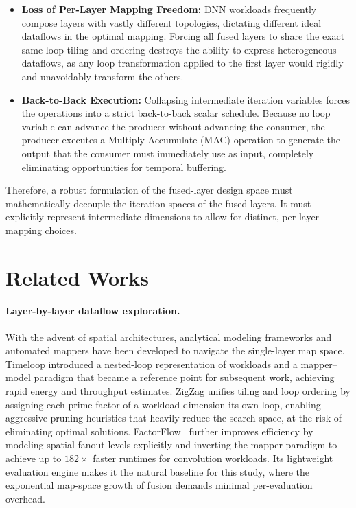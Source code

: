 \documentclass[11pt,a4paper,twocolumn]{article}
\begin{document}
\begin{itemize}
    \item \textbf{Loss of Per-Layer Mapping Freedom:} DNN workloads frequently compose layers with vastly different topologies, dictating different ideal dataflows in the optimal mapping. Forcing all fused layers to share the exact same loop tiling and ordering destroys the ability to express heterogeneous dataflows, as any loop transformation applied to the first layer would rigidly and unavoidably transform the others.
    
    \item \textbf{Back-to-Back Execution:} Collapsing intermediate iteration variables forces the operations into a strict back-to-back scalar schedule. Because no loop variable can advance the producer without advancing the consumer, the producer executes a Multiply-Accumulate (MAC) operation to generate the output that the consumer must immediately use as input, completely eliminating opportunities for temporal buffering.
\end{itemize}

Therefore, a robust formulation of the fused-layer design space must mathematically decouple the iteration spaces of the fused layers. It must explicitly represent intermediate dimensions to allow for distinct, per-layer mapping choices.



\section*{Related Works}

\paragraph{Layer-by-layer dataflow exploration.}
With the advent of spatial architectures, analytical modeling
frameworks and automated mappers have been developed to navigate
the single-layer map space.
Timeloop introduced a nested-loop
representation of workloads and a mapper--model paradigm that
became a reference point for subsequent work, achieving rapid energy and throughput estimates.
ZigZag unifies tiling and loop ordering by assigning
each prime factor of a workload dimension its own loop, enabling
aggressive pruning heuristics that heavily reduce the search space, at the risk of eliminating optimal solutions.
FactorFlow~\cite{Factorflow} further improves efficiency
by modeling spatial fanout levels explicitly and inverting the
mapper paradigm to achieve
up to $182\times$ faster runtimes for convolution workloads.
Its lightweight evaluation engine makes it the natural baseline for
this study, where the exponential map-space growth of fusion demands
minimal per-evaluation overhead.
\end{document}
